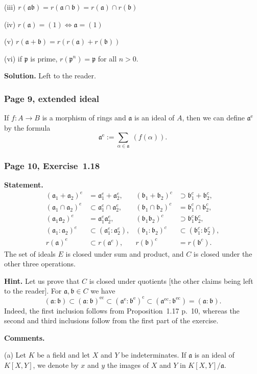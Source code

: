 \documentclass[12pt,letterpaper]{article}%
\newcommand{\oo}{\operatorname}\newcommand{\ooo}{\operatorname*}
\newcommand{\mf}{\mathfrak}
\newcommand{\aaa}{\mf a}
\newcommand{\bbb}{\mf b}
\newcommand{\ppp}{\mf p}
\newcommand{\nn}{\noindent}
\begin{document}
\nn(iii) $r(\aaa\bbb)=r(\aaa\cap\bbb)=r(\aaa)\cap r(\bbb)$ 

\nn(iv) $r(\aaa)=(1)\iff\aaa=(1)$

\nn(v) $r(\aaa+\bbb)=r(r(\aaa)+r(\bbb))$

\nn(vi) if $\ppp$ is prime, $r(\ppp^n)=\ppp$ for all $n>0$.

\nn\textbf{Solution.} Left to the reader.%

\subsubsection{Page 9, extended ideal}%

If $f:A\to B$ is a morphism of rings and $\aaa$ is an ideal of $A$, then we can define $\aaa^{\oo e}$ by the formula
$$
\aaa^{\oo e}:=\sum_{\alpha\in\aaa}\ (f(\alpha)).
$$

\subsubsection{Page 10, Exercise~1.18}\label{ex1.18p10}%

\textbf{Statement.}
\begin{align*}
(\aaa_1+\aaa_2)^e&=\aaa_1^e+\aaa_2^e, &(\bbb_1+\bbb_2)^c&\supset\bbb_1^c+\bbb_2^c,\\%
(\aaa_1\cap\aaa_2)^e&\subset\aaa_1^e\cap\aaa_2^e, &(\bbb_1\cap\bbb_2)^c&=\bbb_1^c\cap\bbb_2^c,\\%
(\aaa_1\aaa_2)^e&=\aaa_1^e\aaa_2^e,                &(\bbb_1\bbb_2)^c&\supset\bbb_1^c\bbb_2^c,\\%
(\aaa_1:\aaa_2)^e&\subset(\aaa_1^e:\aaa_2^e), &(\bbb_1:\bbb_2)^c&\subset(\bbb_1^c:\bbb_2^c),\\%
r(\aaa)^e&\subset r(\aaa^e), &r(\bbb)^c&=r(\bbb^c).
\end{align*}
The set of ideals $E$ is closed under sum and product, and $C$ is closed under the other three operations.

\nn\textbf{Hint.} Let us prove that $C$ is closed under quotients [the other claims being left to the reader]. For $\aaa,\bbb\in C$ we have
$$
(\aaa:\bbb)\subset(\aaa:\bbb)^{\oo{ec}}\subset(\aaa^{\oo e}:\bbb^{\oo e})^{\oo c}\subset(\aaa^{\oo{ec}}:\bbb^{\oo{ec}})=(\aaa:\bbb).
$$ 
Indeed, the first inclusion follows from Proposition~1.17 p.~10, whereas the second and third inclusions follow from the first part of the exercise.

\nn\textbf{Comments.} 

\nn(a) Let $K$ be a field and let $X$ and $Y$ be indeterminates. If $\aaa$ is an ideal of $K[X,Y]$, we denote by $x$ and $y$ the images of $X$ and $Y$ in $K[X,Y]/\aaa$.
\end{document}

